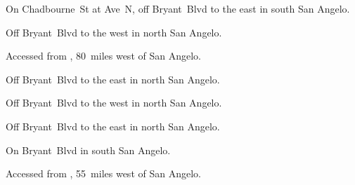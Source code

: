 

\begin{LocationList}

On  Chadbourne~St at Ave~N, off   Bryant~Blvd to the east in south San Angelo.

Off  Bryant~Blvd to the west in north San Angelo.

Accessed from , 80~miles west of San Angelo.

Off  Bryant~Blvd to the east in north San Angelo.

Off  Bryant~Blvd to the west in north San Angelo.

Off  Bryant~Blvd to the east in north San Angelo.

\Location{\TruckStop \Gas \Rest}
On   Bryant~Blvd in south San Angelo.

Accessed from , 55~miles west of San Angelo.

\end{LocationList}
